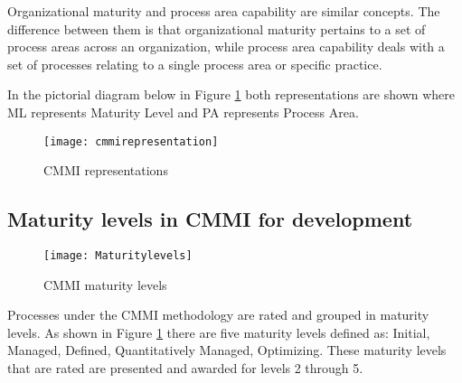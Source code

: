 Organizational maturity and process area capability are similar concepts. The difference between them is that organizational maturity pertains to a set of process areas across an organization, while process area capability deals with a set of processes relating to a single process area or specific practice.

In the pictorial diagram below in Figure \ref{fig:cmmirepresentation} both representations are shown where ML represents Maturity Level and PA represents Process Area.

\begin{figure}[h]
	\begin{center}
		\leavevmode
		\texttt{[image: cmmirepresentation]}
		\caption{CMMI representations}
		\label{fig:cmmirepresentation}
	\end{center}
\end{figure}

\subsection{Maturity levels in CMMI for development}
\begin{figure}[h]
	\begin{center}
		\leavevmode
		\texttt{[image: Maturitylevels]}
		\caption{CMMI maturity levels}
		\label{fig:maturitylevels}
	\end{center}
\end{figure}
Processes under the CMMI methodology are rated and grouped in maturity levels. As shown in Figure \ref{fig:cmmirepresentation} there are five  maturity levels defined as: Initial, Managed, Defined, Quantitatively Managed, Optimizing. These maturity levels that are rated are presented and awarded for levels 2 through 5.

